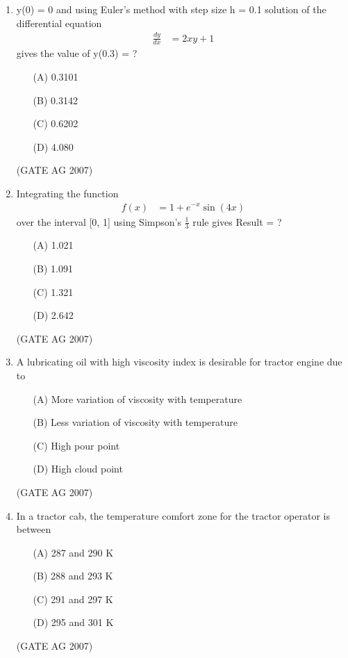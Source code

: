 \documentclass[journal,12pt,onecolumn]{IEEEtran}
\theoremstyle{remark}
\begin{document}
\begin{enumerate}[label=Q\arabic*:]
\item 

y(0) = 0 and using Euler's method with step size h = 0.1 solution of the differential equation
\begin{align*}
\frac{dy}{dx} &= 2xy + 1
\end{align*}
gives the value of
y(0.3)  =  ?
\begin{multicols}{4}
\begin{enumerate}
    \item[(A)] 0.3101
    \item[(B)] 0.3142
    \item[(C)] 0.6202
    \item[(D)] 4.080
\end{enumerate}
\end{multicols}
\hfill(GATE AG 2007)


\item Integrating the function
\begin{align*}
f(x) &= 1 + e^{-x} \sin(4x)
\end{align*}
over the interval [0, 1] using Simpson's $\frac{1}{3}$ rule gives Result =  ?
\begin{multicols}{4}
\begin{enumerate}
    \item[(A)] 1.021
    \item[(B)] 1.091
    \item[(C)] 1.321
    \item[(D)] 2.642
\end{enumerate}
\end{multicols}
\hfill(GATE AG 2007)


\item  A lubricating oil with high viscosity index is desirable for tractor engine due to

\begin{enumerate}
    \item[(A)] More variation of viscosity with temperature
    \item[(B)] Less variation of viscosity with temperature
    \item[(C)] High pour point
    \item[(D)] High cloud point
\end{enumerate}
\hfill(GATE AG 2007)

\item  In a tractor cab, the temperature comfort zone for the tractor operator is between
\begin{multicols}{4}
\begin{enumerate}
    \item[(A)] 287 and 290 K
    \item[(B)] 288 and 293 K
    \item[(C)] 291 and 297 K
    \item[(D)] 295 and 301 K
\end{enumerate}
\end{multicols}
\hfill(GATE AG 2007)


\end{enumerate}
\end{document}
